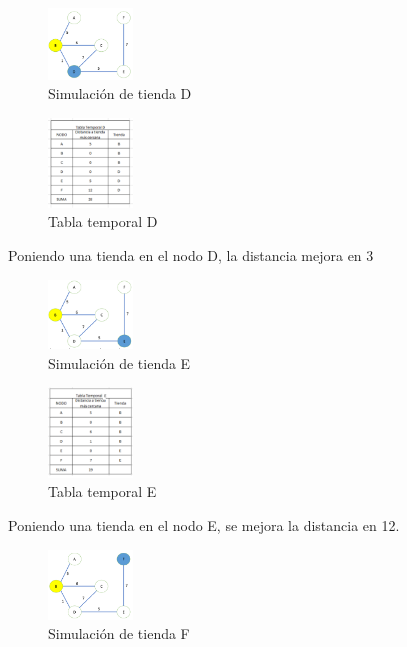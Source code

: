 \documentclass[conference,compsoc]{IEEEtran}
\begin{document}
\begin{figure}[h]
    \centering
    \includegraphics[width=0.20\textwidth]{Problema1/p9.png}
    \caption{ Simulación de tienda D }
    \label{fig:mesh1}
\end{figure}
\begin{figure}[h]
    \centering
    \includegraphics[width=0.20\textwidth]{Problema1/p10.png}
    \caption{Tabla temporal D}
    \label{fig:mesh1}
\end{figure}
$$$$
Poniendo una tienda en el nodo D, la distancia mejora en 3
\begin{figure}[h]
    \centering
    \includegraphics[width=0.20\textwidth]{Problema1/p11.png}
    \caption{ Simulación de tienda E }
    \label{fig:mesh1}
\end{figure}
\begin{figure}[h]
    \centering
    \includegraphics[width=0.20\textwidth]{Problema1/p12.png}
    \caption{Tabla temporal E}
    \label{fig:mesh1}
\end{figure}
$$$$
Poniendo una tienda en el nodo E, se mejora la distancia en 12.
\begin{figure}[h]
    \centering
    \includegraphics[width=0.20\textwidth]{Problema1/p13.png}
    \caption{ Simulación de tienda F }
    \label{fig:mesh1}
\end{figure}
\end{document}
